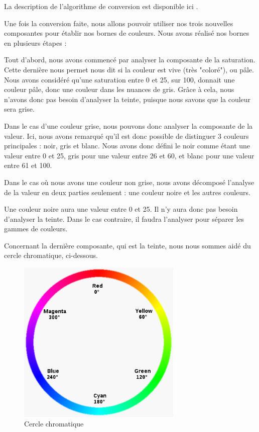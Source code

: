 \documentclass[12pt,titlepage,french]{article}
\begin{document}
La description de l'algorithme de conversion est disponible ici \cite{B02}. \newline

Une fois la conversion faite, nous allons pouvoir utiliser nos trois nouvelles composantes pour établir nos bornes de couleurs. Nous avons réalisé nos bornes en plusieurs étapes : \newline

Tout d'abord, nous avons commencé par analyser la composante de la saturation. Cette dernière nous permet nous dit si la couleur est vive (très "coloré"), ou pâle. Nous avons considéré qu'une saturation entre 0 et 25, sur 100, donnait une couleur pâle, donc une couleur dans les nuances de gris. Grâce à cela, nous n'avons donc pas besoin d'analyser la teinte, puisque nous savons que la couleur sera grise. \newline

Dans le cas d'une couleur grise, nous pouvons donc analyser la composante de la valeur. Ici, nous avons remarqué qu'il est donc possible de distinguer 3 couleurs principales : noir, gris et blanc. Nous avons donc défini le noir comme étant une valeur entre 0 et 25, gris pour une valeur entre 26 et 60, et blanc pour une valeur entre 61 et 100. \newline

Dans le cas où nous avons une couleur non grise, nous avons décomposé l'analyse de la valeur en deux parties seulement : une couleur noire et les autres couleurs. \newline

Une couleur noire aura une valeur entre 0 et 25. Il n'y aura donc pas besoin d'analyser la teinte. Dans le cas contraire, il faudra l'analyser pour séparer les gammes de couleurs. \newline

Concernant la dernière composante, qui est la teinte, nous nous sommes aidé du cercle chromatique, ci-dessous.

\begin{figure}[H]
\center
\includegraphics[width=0.7\textwidth]{./img/cercle_chromatique.png}
\caption{\label{} Cercle chromatique}
\end{figure}
\end{document}
